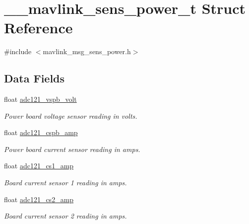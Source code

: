 \hypertarget{struct____mavlink__sens__power__t}{\section{\+\_\+\+\_\+mavlink\+\_\+sens\+\_\+power\+\_\+t Struct Reference}
\label{struct____mavlink__sens__power__t}
}


{\ttfamily \#include $<$mavlink\+\_\+msg\+\_\+sens\+\_\+power.\+h$>$}

\subsection*{Data Fields}
\begin{DoxyCompactItemize}
\item 
float \hyperlink{struct____mavlink__sens__power__t_afd4bfbfe51559f8b690acd07230aa1ab}{adc121\+\_\+vspb\+\_\+volt}
\begin{DoxyCompactList}\small\item\em Power board voltage sensor reading in volts. \end{DoxyCompactList}\item 
float \hyperlink{struct____mavlink__sens__power__t_a905398f6b5d82ca31b2ebc92ff1eb6f0}{adc121\+\_\+cspb\+\_\+amp}
\begin{DoxyCompactList}\small\item\em Power board current sensor reading in amps. \end{DoxyCompactList}\item 
float \hyperlink{struct____mavlink__sens__power__t_a1a8b51e43e6d3c0e97656a00bba5255b}{adc121\+\_\+cs1\+\_\+amp}
\begin{DoxyCompactList}\small\item\em Board current sensor 1 reading in amps. \end{DoxyCompactList}\item 
float \hyperlink{struct____mavlink__sens__power__t_a6fee748d447863cb003692ce22b64a56}{adc121\+\_\+cs2\+\_\+amp}
\begin{DoxyCompactList}\small\item\em Board current sensor 2 reading in amps. \end{DoxyCompactList}\end{DoxyCompactItemize}


